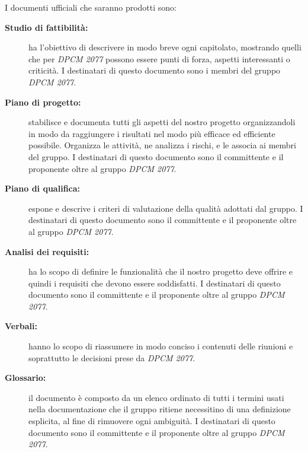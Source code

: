 					I documenti ufficiali che saranno prodotti sono:
					\begin{description}
						\item[\textbf{Studio di fattibilità:}] ha l'obiettivo di descrivere in modo breve ogni capitolato, mostrando quelli che per \textit{DPCM 2077} possono essere punti di forza, aspetti interessanti o criticità. I destinatari di questo documento sono i membri del gruppo \textit{DPCM 2077}.
						\item[\textbf{Piano di progetto:}] stabilisce e documenta tutti gli aspetti del nostro progetto organizzandoli in modo da raggiungere i risultati nel modo più efficace ed efficiente possibile. Organizza le attività, ne analizza i rischi, e le associa ai membri del gruppo. I destinatari di questo documento sono il committente e il proponente oltre al gruppo \textit{DPCM 2077}. 
						\item[\textbf{Piano di qualifica:}] espone e descrive i criteri di valutazione della qualità adottati dal gruppo. I destinatari di questo documento sono il committente e il proponente oltre al gruppo \textit{DPCM 2077}. 
						\item[\textbf{Analisi dei requisiti:}] ha lo scopo di definire le funzionalità che il nostro progetto deve offrire e quindi i requisiti che devono essere soddisfatti. I destinatari di questo documento sono il committente e il proponente oltre al gruppo \textit{DPCM 2077}.
						\item[\textbf{Verbali:}] hanno lo scopo di riassumere in modo conciso i contenuti delle riunioni e soprattutto le decisioni prese da \textit{DPCM 2077}.
						\item[\textbf{Glossario:}] il documento è composto da un elenco ordinato di tutti i termini usati nella documentazione che il gruppo ritiene necessitino di una definizione esplicita, al fine di rimuovere ogni ambiguità. I destinatari di questo documento sono il committente e il proponente oltre al gruppo \textit{DPCM 2077}.
					\end{description}
					
